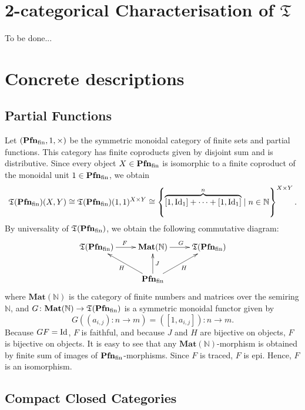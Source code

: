 \section{2-categorical Characterisation of $\mathfrak{T}$}

To be done...


\section{Concrete descriptions}

\subsection{Partial Functions}

Let $(\mathbf{Pfn}_{\mathrm{fin}},1,\times)$ be the symmetric monoidal category of finite
sets and partial functions. This category has finite coproducts given
by disjoint sum and is distributive. Since every object
$X \in \mathbf{Pfn}_{\mathrm{fin}}$ is isomorphic to a finite coproduct of the monoidal
unit $1 \in \mathbf{Pfn}_{\mathrm{fin}}$, we obtain
\begin{equation*}
  \mathfrak{T}(\mathbf{Pfn}_{\mathrm{fin}})(X,Y) \cong
  \mathfrak{T}(\mathbf{Pfn}_{\mathrm{fin}})(1,1)^{X \times Y}
  \cong \left\{\overbrace{[1,\mbox{Id}_{1}] + \cdots + [1,\mbox{Id}_{1}]}^{n}
    \mid n \in \mathbb{N}\right\}^{X \times Y}.
\end{equation*}
By universality of $\mathfrak{T}(\mathbf{Pfn}_{\mathrm{fin}})$, we obtain
the following commutative diagram:
\begin{equation*}
  \xymatrix{
    \mathfrak{T}(\fPfn) \ar[r]^{F} &
    \mathbf{Mat}(\mathbb{N}) \ar[r]^{G} &
    \mathfrak{T}(\fPfn) \\
    & \fPfn \ar[ru]_{H} \ar[u]_{J} \ar[lu]^{H} &
  }
\end{equation*}
where $\mathbf{Mat}(\mathbb{N})$ is the category of finite numbers
and matrices over the semiring $\mathbb{N}$, and
$G \colon \mathbf{Mat}(\mathbb{N}) \to \mathfrak{T}(\mathbf{Pfn}_{\mathrm{fin}})$
is a symmetric monoidal functor given by
\begin{equation*}
  G((a_{i,j}) \colon n \to m)
  = ([1,a_{i,j}]) \colon n \to m.
\end{equation*}
Because $GF = \mbox{Id}$, $F$ is faithful, and
because $J$ and $H$ are bijective on objects,
$F$ is bijective on objects.
It is easy to see that any $\mathbf{Mat}(\mathbb{N})$-morphism
is obtained by finite sum of images of $\mathbf{Pfn}_{\mathrm{fin}}$-morphisms.
Since $F$ is traced, $F$ is epi. Hence, $F$ is an isomorphism.


\subsection{Compact Closed Categories}

